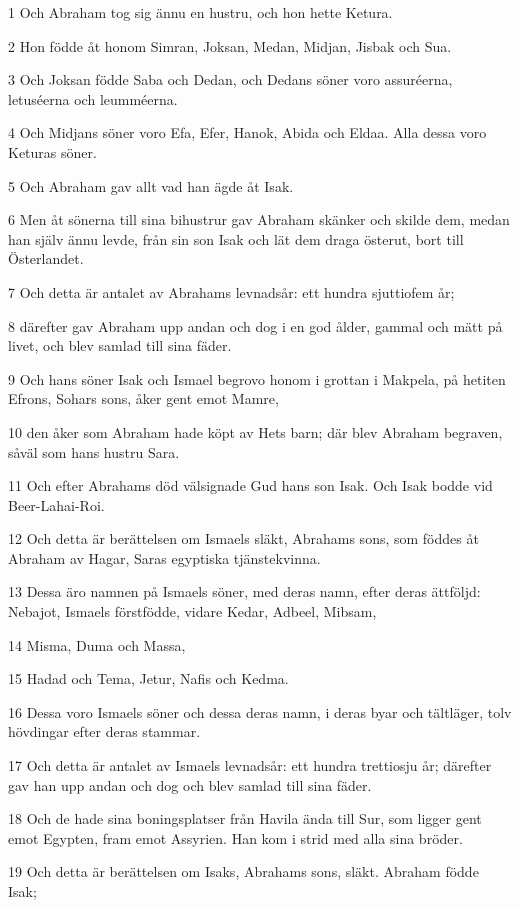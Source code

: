 \par 1 Och Abraham tog sig ännu en hustru, och hon hette Ketura.
\par 2 Hon födde åt honom Simran, Joksan, Medan, Midjan, Jisbak och Sua.
\par 3 Och Joksan födde Saba och Dedan, och Dedans söner voro assuréerna, letuséerna och leumméerna.
\par 4 Och Midjans söner voro Efa, Efer, Hanok, Abida och Eldaa. Alla dessa voro Keturas söner.
\par 5 Och Abraham gav allt vad han ägde åt Isak.
\par 6 Men åt sönerna till sina bihustrur gav Abraham skänker och skilde dem, medan han själv ännu levde, från sin son Isak och lät dem draga österut, bort till Österlandet.
\par 7 Och detta är antalet av Abrahams levnadsår: ett hundra sjuttiofem år;
\par 8 därefter gav Abraham upp andan och dog i en god ålder, gammal och mätt på livet, och blev samlad till sina fäder.
\par 9 Och hans söner Isak och Ismael begrovo honom i grottan i Makpela, på hetiten Efrons, Sohars sons, åker gent emot Mamre,
\par 10 den åker som Abraham hade köpt av Hets barn; där blev Abraham begraven, såväl som hans hustru Sara.
\par 11 Och efter Abrahams död välsignade Gud hans son Isak. Och Isak bodde vid Beer-Lahai-Roi.
\par 12 Och detta är berättelsen om Ismaels släkt, Abrahams sons, som föddes åt Abraham av Hagar, Saras egyptiska tjänstekvinna.
\par 13 Dessa äro namnen på Ismaels söner, med deras namn, efter deras ättföljd: Nebajot, Ismaels förstfödde, vidare Kedar, Adbeel, Mibsam,
\par 14 Misma, Duma och Massa,
\par 15 Hadad och Tema, Jetur, Nafis och Kedma.
\par 16 Dessa voro Ismaels söner och dessa deras namn, i deras byar och tältläger, tolv hövdingar efter deras stammar.
\par 17 Och detta är antalet av Ismaels levnadsår: ett hundra trettiosju år; därefter gav han upp andan och dog och blev samlad till sina fäder.
\par 18 Och de hade sina boningsplatser från Havila ända till Sur, som ligger gent emot Egypten, fram emot Assyrien. Han kom i strid med alla sina bröder.
\par 19 Och detta är berättelsen om Isaks, Abrahams sons, släkt. Abraham födde Isak;
